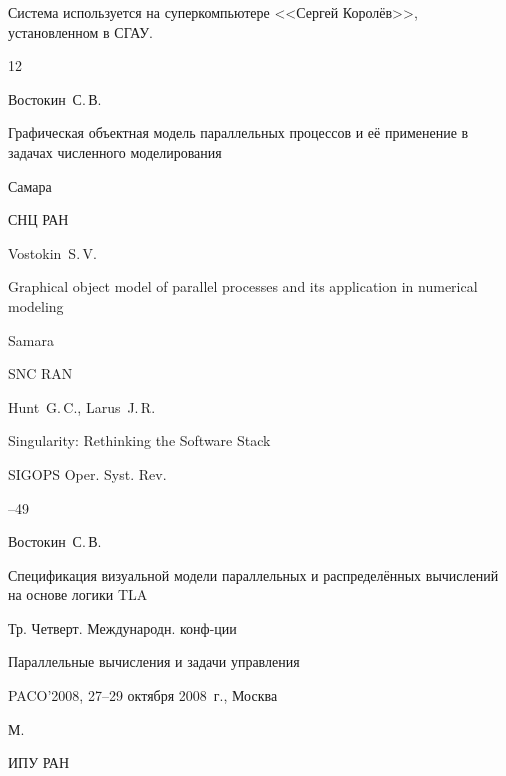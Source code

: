 Система используется на суперкомпьютере <<Сергей Королёв>>, установленном в СГАУ.





\begin{thebibliography}{12}




\by Востокин~С.\,В. 

\book Графическая объектная модель параллельных процессов и её применение в задачах численного моделирования

\publaddr Самара

\publ СНЦ РАН



\misctransl

\by Vostokin~S.\,V.

\book Graphical object model of parallel processes and its application in numerical modeling

\publaddr Samara

\publ SNC RAN








\by Hunt~G.\,C., Larus~J.\,R.

\paper Singularity: Rethinking the Software Stack 

\jour SIGOPS Oper. Syst. Rev.



--49





\by Востокин~С.\,В. 

\paper Спецификация визуальной модели параллельных и распределённых вычислений на основе логики TLA 

\bookinfo Тр. Четверт. Международн. конф-ции 

\inbook Параллельные вычисления и задачи управления

\procinfo PACO'2008, 27--29 октября 2008~г., Москва

\publaddr М.

\publ ИПУ РАН


\end{thebibliography}
